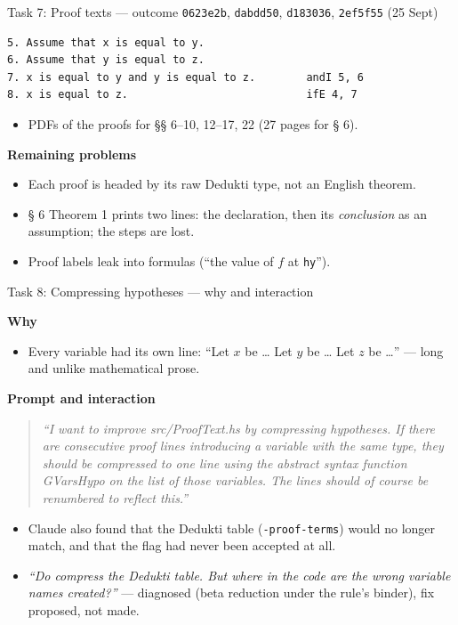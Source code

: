 \documentclass[10pt,aspectratio=169]{beamer}
\newcommand{\bad}[1]{\textcolor{warn}{#1}}
\newcommand{\commit}[1]{\texttt{\footnotesize #1}}
\newcommand{\prompt}[1]{\begin{quote}\small\itshape ``#1''\end{quote}}
\newcommand{\why}{\par\textcolor{gfblue}{\textbf{Why}}\par}
\newcommand{\how}{\par\textcolor{gfblue}{\textbf{Prompt and interaction}}\par}
\begin{document}
\begin{frame}[fragile]{Task 7: Proof texts --- outcome}
  \commit{0623e2b}, \commit{dabdd50}, \commit{d183036}, \commit{2ef5f55} (25 Sept)
\begin{lstlisting}
5. Assume that x is equal to y.
6. Assume that y is equal to z.
7. x is equal to y and y is equal to z.        andI 5, 6
8. x is equal to z.                            ifE 4, 7
\end{lstlisting}
  \begin{itemize}\small
    \item PDFs of the proofs for §§ 6--10, 12--17, 22 (27 pages for § 6).
  \end{itemize}
  \textbf{Remaining problems}
  \begin{itemize}\small
    \item Each proof is headed by its raw Dedukti type, not an English theorem.
    \item \bad{§ 6 Theorem 1 prints two lines}: the declaration, then its
          \emph{conclusion} as an assumption; the steps are lost.
    \item Proof labels leak into formulas (``the value of $f$ at \texttt{hy}'').
  \end{itemize}
\end{frame}

\begin{frame}{Task 8: Compressing hypotheses --- why and interaction}
  \why
  \begin{itemize}\small
    \item Every variable had its own line: ``Let $x$ be \dots{} Let $y$ be \dots{}
          Let $z$ be \dots'' --- long and unlike mathematical prose.
  \end{itemize}
  \how
  \prompt{I want to improve src/ProofText.hs by compressing hypotheses. If
    there are consecutive proof lines introducing a variable with the same type,
    they should be compressed to one line using the abstract syntax function
    GVarsHypo on the list of those variables. The lines should of course be
    renumbered to reflect this.}
  \begin{itemize}\small
    \item Claude also found that the Dedukti table (\texttt{-proof-terms})
          would no longer match, and that the flag had never been accepted at all.
    \item \emph{``Do compress the Dedukti table. But where in the code are the wrong
          variable names created?''} --- diagnosed (beta reduction under the rule's
          binder), fix proposed, not made.
  \end{itemize}
\end{frame}
\end{document}
